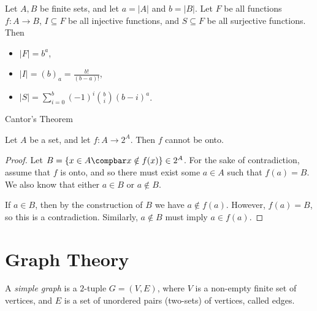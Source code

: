 \documentclass[12pt]{article}
\begin{document}
\begin{prop}
    Let $A, B$ be finite sets, and let $a = |A|$ and $b = |B|$. Let $F$ be all functions $f: A \to B$, $I \subseteq F$ be all injective functions, and $S \subseteq F$ be all surjective functions. Then
    \begin{itemize}
        \item $|F| = b^a$,
        \item $|I| = (b)_a = \frac{b!}{(b-a)!}$,
        \item $|S| = \sum_{i=0}^b(-1)^i\binom{b}{i}(b-i)^a$.
    \end{itemize}
\end{prop}

\begin{thm}
    Cantor's Theorem

    Let $A$ be a set, and let $f: A \to 2^A$. Then $f$ cannot be onto.
\end{thm}

\begin{proof}
    Let $B = \left\{x \in A \compbar x \notin f(x) \right\} \in 2^A$. For the sake of contradiction, assume that $f$ is onto, and so there must exist some $a \in A$ such that $f(a) = B$. We also know that either $a \in B$ or $a \notin B$.

    If $a \in B$, then by the construction of $B$ we have $a \notin f(a)$. However, $f(a) = B$, so this is a contradiction. Similarly, $a \notin B$ must imply $a \in f(a)$.
\end{proof}

\section{Graph Theory}

\begin{defn}
    A \emph{simple graph} is a $2$-tuple $G = (V, E)$, where $V$ is a non-empty finite set of vertices, and $E$ is a set of unordered pairs (two-sets) of vertices, called edges.
\end{defn}
\end{document}
